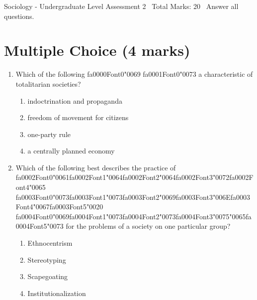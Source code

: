 \documentclass[12pt]{article}
\begin{document}
\begin{center}
Sociology - Undergraduate Level Assessment 2 \
Total Marks: 20 \
Answer all questions.
\end{center}

\section*{Multiple Choice (4 marks)}
\begin{enumerate}[label=\arabic*.]
\item Which of the following {\csname fa0000Font0\endcsname\char"0069} {\csname fa0001Font0\endcsname\char"0073} a characteristic of totalitarian societies?
\begin{enumerate}[label=(\alph*)]
    \item indoctrination and propaganda
    \item freedom of movement for citizens
    \item one-party rule
    \item a centrally planned economy
\end{enumerate}
\item Which of the following best describes the practice of {\csname fa0002Font0\endcsname\char"0061}{\csname fa0002Font1\endcsname\char"0064}{\csname fa0002Font2\endcsname\char"0064}{\csname fa0002Font3\endcsname\char"0072}{\csname fa0002Font4\endcsname\char"0065} {\csname fa0003Font0\endcsname\char"0073}{\csname fa0003Font1\endcsname\char"0073}{\csname fa0003Font2\endcsname\char"0069}{\csname fa0003Font3\endcsname\char"006E}{\csname fa0003Font4\endcsname\char"0067}{\csname fa0003Font5\endcsname\char"0020} {\csname fa0004Font0\endcsname\char"0069}{\csname fa0004Font1\endcsname\char"0073}{\csname fa0004Font2\endcsname\char"0073}{\csname fa0004Font3\endcsname\char"0075}{\char"0065}{\csname fa0004Font5\endcsname\char"0073} for the problems of a society on one particular group?
\begin{enumerate}[label=(\alph*)]
    \item Ethnocentrism
    \item Stereotyping
    \item Scapegoating
    \item Institutionalization
\end{enumerate}
\end{enumerate}
\end{document}

